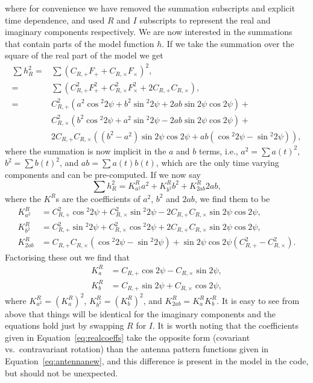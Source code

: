 where for convenience we have removed the summation subscripts and explicit time dependence, and used $R$ and $I$ subscripts to represent the real and imaginary components respectively. We are now interested in the summations that contain parts of the model function $h$. If we take the summation over the square of the real part of the model we get
\begin{align}\label{eq:exlikepart}
\sum h_R^2 =& \sum \left(C_{R,+} F_+ + C_{R,\times} F_{\times} \right)^2, \nonumber \\
 = & \sum \left(C_{R,+}^2 F_+^2 + C_{R,\times}^2 F_{\times}^2 + 2C_{R,+}C_{R,\times}\right), \nonumber \\
 = & C_{R,+}^2 \left(a^2 \cos{}^2{2\psi} + b^2 \sin{}^2{2\psi} + 2ab\sin{2\psi}\cos{2\psi}\right) + \nonumber \\
 & C_{R,\times}^2 \left(b^2 \cos{}^2{2\psi} + a^2\sin{}^2{2\psi} - 2ab\sin{2\psi}\cos{2\psi} \right) + \nonumber \\
 & 2C_{R,+}C_{R,\times}\left( (b^2 - a^2)\sin{2\psi}\cos{2\psi} + ab(\cos{}^2{2\psi} - \sin{}^2{2\psi}) \right),
\end{align}
where the summation is now implicit in the $a$ and $b$ terms, i.e., $a^2 = \sum a(t)^2$, $b^2 = \sum b(t)^2$, and $ab = \sum a(t)b(t)$, which are the only time varying components
and can be pre-computed. If we now say
\begin{equation}
\sum h_R^2 = K_{a^2}^Ra^2 + K_{b^2}^Rb^2 + K_{2ab}^R2ab,
\end{equation}
where the $K^R$s are the coefficients of $a^2$, $b^2$ and $2ab$, we find them to be
\begin{align}
K_{a^2}^R & = C_{R,+}^2 \cos{}^2{2\psi} + C_{R,\times}^2\sin{}^2{2\psi} - 2C_{R,+}C_{R,\times}\sin{2\psi}\cos{2\psi}, \nonumber \\
K_{b^2}^R & = C_{R,+}^2 \sin{}^2{2\psi} + C_{R,\times}^2\cos{}^2{2\psi} + 2C_{R,+}C_{R,\times}\sin{2\psi}\cos{2\psi}, \nonumber \\
K_{2ab}^R & = C_{R,+}C_{R,\times}\left(\cos{}^2{2\psi} - \sin{}^2{2\psi} \right) + \sin{2\psi}\cos{2\psi}\left(C_{R,+}^2 - C_{R,\times}^2\right).
\end{align}
Factorising these out we find that
\begin{align}\label{eq:realcoeffs}
K_{a}^R &= C_{R,+}\cos{2\psi} - C_{R,\times}\sin{2\psi}, \nonumber \\
K_{b}^R &= C_{R,+}\sin{2\psi} + C_{R,\times}\cos{2\psi},
\end{align}
where $K_{a^2}^R = \left(K_{a}^R\right)^2$, $K_{b^2}^R = \left(K_{b}^R\right)^2$, and $K_{2ab}^R = K_{a}^RK_{b}^R$.
It is easy to see from above that things will be identical for the imaginary components and the equations hold just
by swapping $R$ for $I$.
It is worth noting that the coefficients given in Equation~\ref{eq:realcoeffs} take the opposite form (covariant vs.\ contravariant rotation) than
the antenna pattern functions given in Equation~\ref{eq:antennanew}, and this difference is present in the model
in the \lppen code, but should not be unexpected.

